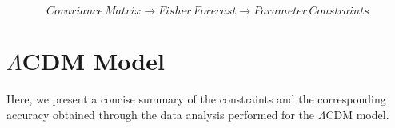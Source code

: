 \documentclass[universe,article,accept,moreauthors,pdftex]{Definitions/mdpi}
\begin{document}
 
     $$ Covariance\, Matrix \to Fisher \, Forecast\to Parameter\, Constraints$$














 








\section[\appendixname~\thesection]{ $\Lambda$CDM Model}
\label{AppendixC}



Here, we present a concise summary of the constraints and the corresponding accuracy obtained through the data analysis performed for the $\Lambda$CDM model.
\end{document}
